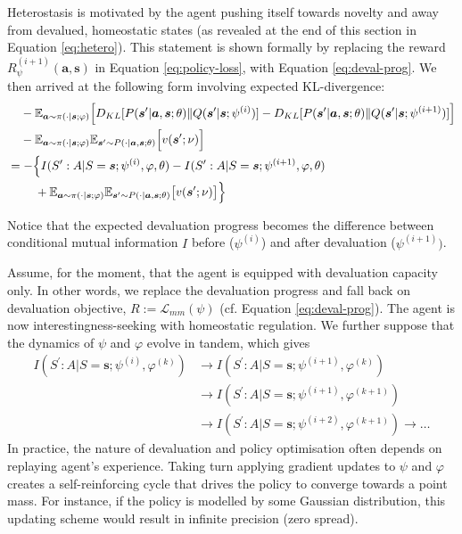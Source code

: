\documentclass[utf8]{frontiersSCNS}
\newcommand{\bs}{\boldsymbol}
\begin{document}
Heterostasis is motivated by the agent pushing itself towards novelty and away from devalued, homeostatic states (as revealed at the end of this section in Equation \ref{eq:hetero}). This statement is shown formally by replacing the reward $R^{(i+1)}_\psi(\bs a, \bs s)$ in Equation \ref{eq:policy-loss}, with Equation \ref{eq:deval-prog}. We then arrived at the following form involving expected KL-divergence:
%
	\begin{equation}
	\begin{aligned} 
	&\phantom{={}} 
		-\mathbb{E}_{\bs{a} \sim \pi(\cdot | \bs{s};\varphi)} 
		\Big[ 
		D_{KL}[P(\bs{s}^\prime|\bs{a}, \bs{s}; \theta) \Vert Q(\bs{s}^\prime|\bs{s};\psi^{(i  )})] -
		D_{KL}[P(\bs{s}^\prime|\bs{a}, \bs{s}; \theta) \Vert Q(\bs{s}^\prime|\bs{s};\psi^{(i+1)})]
		\Big] \\
	&\phantom{={}} 
		- \mathbb{E}_{\bs{a}\sim\pi(\cdot|\bs{s};\varphi)}
		  \mathbb{E}_{\bs{s}^\prime \sim P(\cdot | \bs{a}, \bs{s}; \theta)} 
		  \Big[ v(\bs{s}^\prime; \nu) \Big] \\
	&= 
		- \Bigl\{ 
		I(S^\prime : A|S=\bs{s}; \psi^{(i)}, \varphi, \theta) -  
		I(S^\prime : A|S=\bs{s}; \psi^{(i+1)}, \varphi, \theta) 
		\Bigr. \\
	&\phantom{={}-\Big.} 
		+ \Bigl. 
		\mathbb{E}_{\bs{a}\sim\pi(\cdot|\bs{s};\varphi)}
		\mathbb{E}_{\bs{s}^\prime \sim P(\cdot | \bs{a}, \bs{s}; \theta)} 
		\big[ v(\bs{s}^\prime; \nu) \big] 
		\Bigr\}
	\end{aligned}
	\end{equation}

Notice that the expected devaluation progress becomes the difference between conditional mutual information $I$ before ($\psi^{(i)}$) and after devaluation ($\psi^{(i+1)})$.

Assume, for the moment, that the agent is equipped with devaluation capacity only. In other words, we replace the devaluation progress and fall back on devaluation objective, $R := \mathcal{L}_{mm}(\psi)$ (cf. Equation \ref{eq:deval-prog}). The agent is now interestingness-seeking with homeostatic regulation. We further suppose that the dynamics of $\psi$ and $\varphi$ evolve in tandem, which gives
%
	\begin{equation}
	\begin{aligned} \label{eq:pardyn}
	I(S^\prime : A | S=\bs{s}; \psi^{(i)}, \varphi^{(k)}) &\to I(S^\prime : A | S=\bs{s}; \psi^{(i+1)}, \varphi^{(k)}) \\
		&\to I(S^\prime : A | S=\bs{s}; \psi^{(i+1)}, \varphi^{(k+1)}) \\
		&\to I(S^\prime : A | S=\bs{s}; \psi^{(i+2)}, \varphi^{(k+1)}) \to \dots
	\end{aligned}
	\end{equation}
%
In practice, the nature of devaluation and policy optimisation often depends on replaying agent's experience. Taking turn applying gradient updates to $\psi$ and $\varphi$ creates a self-reinforcing cycle that drives the policy to converge towards a point mass. For instance, if the policy is modelled by some Gaussian distribution, this updating scheme would result in infinite precision (zero spread).
\end{document}
